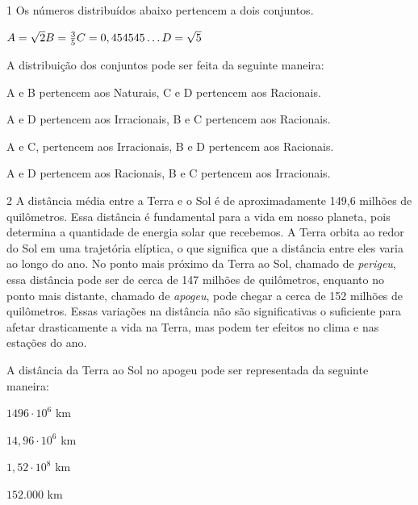 
\num{1} Os números distribuídos abaixo pertencem a dois conjuntos.

$A = \sqrt{2} \\ 
B = \frac{3}{5} \\ 
C = 0,454545\ldots{} \\
D = \sqrt{5}$

A distribuição dos conjuntos pode ser feita da seguinte maneira:

\begin{escolha}

  \item A e B pertencem aos Naturais, C e D pertencem aos Racionais.

  \item A e D pertencem aos Irracionais, B e C pertencem aos Racionais.
  
  \item A e C, pertencem aos Irracionais, B e D pertencem aos Racionais.
  
  \item A e D pertencem aos Racionais, B e C pertencem aos Irracionais.

\end{escolha}



\num{2} A distância média entre a Terra e o Sol é de aproximadamente 149,6
milhões de quilômetros. Essa distância é fundamental para a vida em
nosso planeta, pois determina a quantidade de energia solar que
recebemos. A Terra orbita ao redor do Sol em uma trajetória elíptica,
o que significa que a distância entre eles varia ao longo do ano. No
ponto mais próximo da Terra ao Sol, chamado de \textit{perigeu}, essa distância
pode ser de cerca de 147 milhões de quilômetros, enquanto no ponto
mais distante, chamado de \textit{apogeu}, pode chegar a cerca de 152 milhões
de quilômetros. Essas variações na distância não são significativas o
suficiente para afetar drasticamente a vida na Terra, mas podem ter
efeitos no clima e nas estações do ano.

A distância da Terra ao Sol no apogeu pode ser representada da seguinte maneira:

\begin{escolha}

  \item $1496 \cdot 10^{6}$ km 

  \item $14,96 \cdot 10^{6}$ km 

  \item $1,52 \cdot 10^{8}$ km 

  \item $152.000$ km

\end{escolha}

